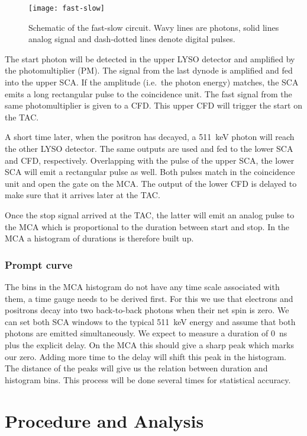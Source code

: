 \documentclass[11pt, english, fleqn, DIV=15, headinclude, BCOR=2cm]{scrreprt}
\begin{document}
\begin{figure}
    \centering
    \texttt{[image: fast-slow]}
    \caption{%
        Schematic of the fast-slow circuit. Wavy lines are photons, solid lines
        analog signal and dash-dotted lines denote digital pulses.
    }
    \label{fig:fast-slow}
\end{figure}

The start photon will be detected in the upper LYSO detector and amplified by
the photomultiplier (PM). The signal from the last dynode is amplified and fed
into the upper SCA\@. If the amplitude (i.e.\ the photon energy) matches, the SCA
emits a long rectangular pulse to the coincidence unit. The fast signal from
the same photomultiplier is given to a CFD\@. This upper CFD will trigger the
start on the TAC\@.

A short time later, when the positron has decayed, a
\SI{511}{\kilo\electronvolt} photon will reach the other LYSO detector. The
same outputs are used and fed to the lower SCA and CFD, respectively.
Overlapping with the pulse of the upper SCA, the lower SCA will emit a
rectangular pulse as well. Both pulses match in the coincidence unit and open
the gate on the MCA\@. The output of the lower CFD is delayed to make sure that
it arrives later at the TAC\@.

Once the stop signal arrived at the TAC, the latter will emit an analog pulse
to the MCA which is proportional to the duration between start and stop. In the
MCA a histogram of durations is therefore built up.

\subsection{Prompt curve}

The bins in the MCA histogram do not have any time scale associated with them,
a time gauge needs to be derived first. For this we use that electrons and
positrons decay into two back-to-back photons when their net spin is zero. We
can set both SCA windows to the typical \SI{511}{\kilo\electronvolt} energy and
assume that both photons are emitted simultaneously. We expect to measure a
duration of \SI{0}{\nano\second} plus the explicit delay. On the MCA this
should give a sharp peak which marks our zero. Adding more time to the delay
will shift this peak in the histogram. The distance of the peaks will give us
the relation between duration and histogram bins. This process will be done
several times for statistical accuracy.

\chapter{Procedure and Analysis}
\end{document}
